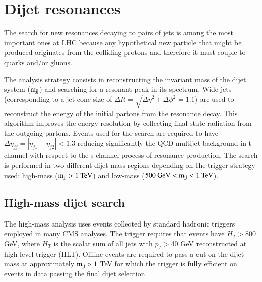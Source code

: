 \documentclass[epj]{webofc}
\begin{document}
\section{Dijet resonances}
\label{dijet}
The search for new resonances decaying to pairs of jets is among the
most important ones at LHC because any hypothetical new particle that
might be produced originates from the colliding protons and therefore
it must couple to quarks and/or gluons. 

The analysis strategy consists in reconstructing the invariant mass of
the dijet system ($\rm{m}_{\rm{jj}}$) and searching for a resonant peak in its
spectrum. Wide-jets
(corresponding to a jet cone size of $\Delta R =\sqrt{{\Delta\eta}^2+{\Delta\phi}^2}=1.1$) are used to reconstruct the
energy of the initial partons from the resonance decay. This algorithm
improves the energy resolution by collecting final state radiation
from the outgoing partons. Events used for the search are required to
have $\Delta \eta_{jj}=|\eta_{j1}-\eta_{j2}|<1.3$ reducing
significantly the QCD multijet background in t-channel with respect to
the s-channel process of resonance production.
The search is performed in two different dijet mass regions
depending on the trigger strategy used: high-mass 
($\rm{m}_{\rm{jj}}> 1 ~\rm{TeV}$) and low-mass ($500 ~\rm{GeV}
<\rm{m}_{\rm{jj}}<1 ~\rm{TeV}$). 

\subsection{High-mass dijet search}
The high-mass analysis uses events collected by standard hadronic
triggers employed in many CMS analyses. The trigger requires that
events have $H_T>800$ GeV, where $H_T$ is the scalar sum of all jets
with $p_T>$40 GeV reconstructed at high level trigger (HLT).
Offline events are required to pass a cut on the dijet mass at 
approximately $\rm{m}_{\rm{jj}}>1$ TeV for which the trigger is fully efficient
on events in data passing the final dijet selection.
\end{document}
